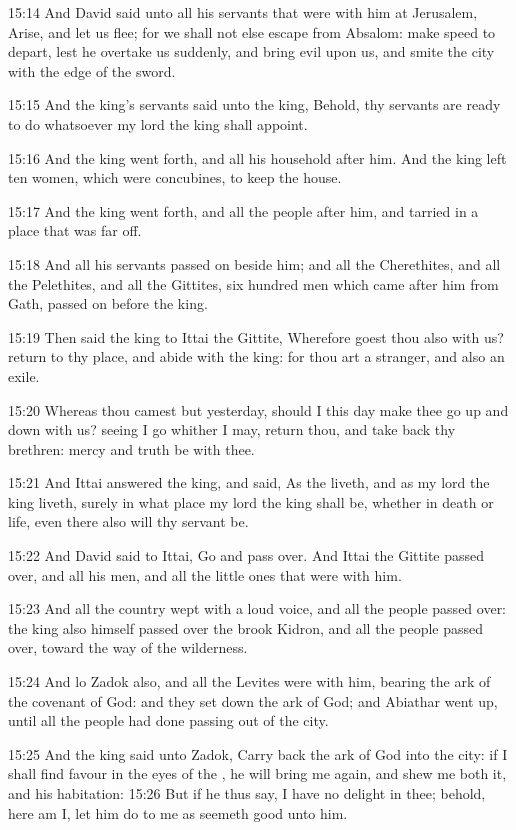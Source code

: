 15:14 And David said unto all his servants that were with him at Jerusalem, Arise, and let us flee; for we shall not else escape from Absalom: make speed to depart, lest he overtake us suddenly, and bring evil upon us, and smite the city with the edge of the sword.

15:15 And the king's servants said unto the king, Behold, thy servants are ready to do whatsoever my lord the king shall appoint.

15:16 And the king went forth, and all his household after him. And the king left ten women, which were concubines, to keep the house.

15:17 And the king went forth, and all the people after him, and tarried in a place that was far off.

15:18 And all his servants passed on beside him; and all the Cherethites, and all the Pelethites, and all the Gittites, six hundred men which came after him from Gath, passed on before the king.

15:19 Then said the king to Ittai the Gittite, Wherefore goest thou also with us? return to thy place, and abide with the king: for thou art a stranger, and also an exile.

15:20 Whereas thou camest but yesterday, should I this day make thee go up and down with us? seeing I go whither I may, return thou, and take back thy brethren: mercy and truth be with thee.

15:21 And Ittai answered the king, and said, As the \LORD liveth, and as my lord the king liveth, surely in what place my lord the king shall be, whether in death or life, even there also will thy servant be.

15:22 And David said to Ittai, Go and pass over. And Ittai the Gittite passed over, and all his men, and all the little ones that were with him.

15:23 And all the country wept with a loud voice, and all the people passed over: the king also himself passed over the brook Kidron, and all the people passed over, toward the way of the wilderness.

15:24 And lo Zadok also, and all the Levites were with him, bearing the ark of the covenant of God: and they set down the ark of God; and Abiathar went up, until all the people had done passing out of the city.

15:25 And the king said unto Zadok, Carry back the ark of God into the city: if I shall find favour in the eyes of the \LORD, he will bring me again, and shew me both it, and his habitation: 15:26 But if he thus say, I have no delight in thee; behold, here am I, let him do to me as seemeth good unto him.

